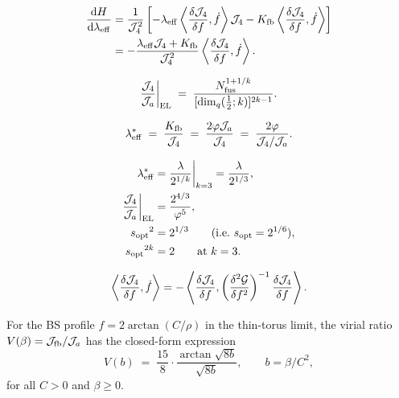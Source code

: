 \begin{align}
  \frac{\mathrm{d}H}{\mathrm{d}\lambda_{\mathrm{eff}}}
  &= \frac{1}{\mathcal{J}_4^2}
    \left[
      -\lambda_{\mathrm{eff}}\left\langle \frac{\delta\mathcal{J}_4}{\delta f},\dot{f}\right\rangle\mathcal{J}_4
      - K_{\mathrm{fb}}\left\langle \frac{\delta\mathcal{J}_4}{\delta f},\dot{f}\right\rangle
    \right] \notag\\
  &= -\frac{\lambda_{\mathrm{eff}}\mathcal{J}_4 + K_{\mathrm{fb}}}{\mathcal{J}_4^2}
    \left\langle \frac{\delta\mathcal{J}_4}{\delta f}, \dot{f}\right\rangle.
  \label{P2:eq:dHdlam2}
\end{align}

\begin{equation}
  \frac{\mathcal{J}_4}{\mathcal{J}_a}\bigg|_{\mathrm{EL}}
  \;=\; \frac{N_{\mathrm{fus}}^{1+1/k}}{[\dim_q(\tfrac{1}{2};k)]^{2k-1}}.
  \label{P2:eq:general_J4J2a}
\end{equation}

\begin{equation}
  \lambda_{\mathrm{eff}}^* \;=\; \frac{K_{\mathrm{fb}}}{\mathcal{J}_4} \;=\; \frac{2\varphi\mathcal{J}_a}{\mathcal{J}_4}
  \;=\; \frac{2\varphi}{\mathcal{J}_4/\mathcal{J}_a}.
  \label{P2:eq:leff_from_ratio}
\end{equation}

\begin{align}
  \lambda_{\mathrm{eff}}^* &= \frac{\lambda}{2^{1/k}}\bigg|_{k=3} = \frac{\lambda}{2^{1/3}},
  \label{P2:eq:leffstar_v1}\\
  \frac{\mathcal{J}_4}{\mathcal{J}_a}\bigg|_{\mathrm{EL}} &= \frac{2^{4/3}}{\varphi^5},
  \label{P2:eq:leffstar_v2}\\
  {s_{\mathrm{opt}}}^2 &= 2^{1/3} \qquad\text{(i.e.\ }s_{\mathrm{opt}} = 2^{1/6}\text{)},
  \label{P2:eq:leffstar_v3}\\
  {s_{\mathrm{opt}}}^{2k} &= 2 \qquad\text{at }k=3.
  \label{P2:eq:leffstar_v4}
\end{align}

\begin{equation}
  \left\langle \frac{\delta\mathcal{J}_4}{\delta f}, \dot{f}\right\rangle
  = -\left\langle \frac{\delta\mathcal{J}_4}{\delta f},
    \left(\frac{\delta^2\mathcal{G}}{\delta f^2}\right)^{-1}
    \frac{\delta\mathcal{J}_4}{\delta f}\right\rangle.
  \label{P2:eq:quad}
\end{equation}

\begin{proposition}
\label{P3:prop:virial_exact}
For the BS profile $f = 2\arctan(C/\rho)$ in the thin-torus limit,
the virial ratio $V(\beta) = \mathcal{J}_{\mathrm{fb}}/\mathcal{J}_a$ has the closed-form expression
\begin{equation}
  V(b) \;=\; \frac{15}{8} \cdot \frac{\arctan\!\sqrt{8b}}{\sqrt{8b}},
  \qquad b = \beta/C^2,
  \label{P3:eq:V_exact}
\end{equation}
for all $C > 0$ and $\beta \geq 0$.
\end{proposition}

